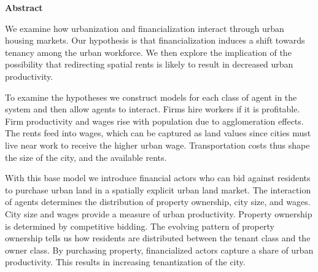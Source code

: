 \begin{center}\textbf{Abstract}\end{center}

We examine how urbanization and financialization interact through urban housing markets. %
Our hypothesis is that financialization induces a shift towards tenancy among the urban workforce.  We then explore the implication of the possibility 
that redirecting spatial rents is likely to result in decreased urban productivity. 

To examine the hypotheses we construct models for each class of agent in the system and then allow agents to interact. Firms hire workers if it is profitable. Firm productivity and wages rise with population due to agglomeration effects. The rents feed into wages, which can be captured as land values since cities must live near work to receive the higher urban wage. Transportation costs thus shape the size of the city, and the available rents. %

With this base model we introduce financial actors who can bid against residents to purchase urban land in a spatially explicit urban land market. %
The interaction of agents determines the distribution of property ownership,  city size, and wages. City size and wages provide a measure of urban productivity. Property ownership is determined by competitive bidding. The evolving pattern of property ownership tells us how residents are distributed between the tenant class and the owner class. %
By purchasing property, financialized actors capture a share of urban productivity. %
This results in increasing tenantization of the city.

